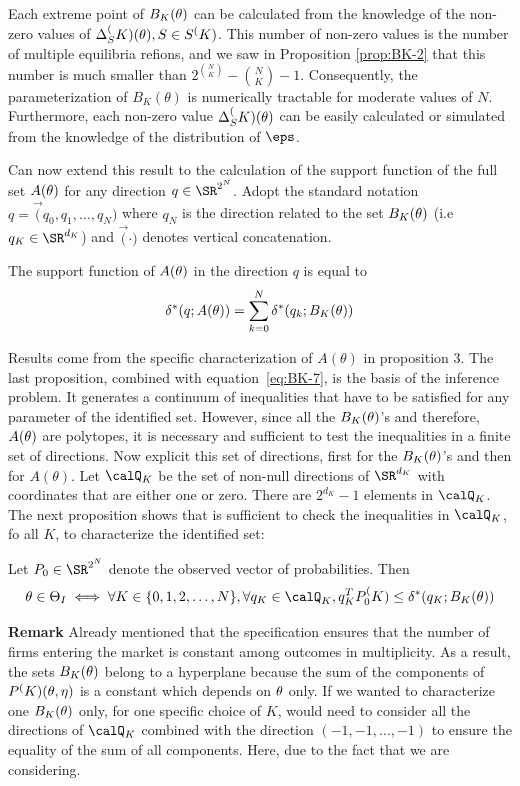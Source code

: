 Each extreme point of $B_K(\theta)$ can be calculated from the knowledge of the non-zero values of $\Delta_S^(K)(\theta), S \in S^(K)$. This number of non-zero values is the number of multiple equilibria refions, and we saw in Proposition \ref{prop:BK-2} that this number is much smaller than $2^{\binom{N}{K}} - \binom{N}{K} - 1$. Consequently, the parameterization of $B_K(\theta)$ is numerically tractable for moderate values of $N$. Furthermore, each non-zero value $\Delta_S^(K)(\theta)$ can be easily calculated or simulated from the knowledge of the distribution of $\eps$. 

Can now extend this result to the calculation of the support function of the full set $A(\theta)$ for any direction $q \in  \SR^{2^N}$. Adopt the standard notation $q = \vec(q_0, q_1, \dots, q_N)$ where $q_N$ is the direction related to the set $B_K(\theta)$ (i.e $q_K \in \SR^{d_K}$) and $\vec(\cdot)$ denotes vertical concatenation. 

\begin{prop}
	\label{prop:BK-5}
	The support function of $A(\theta)$ in the direction $q$ is equal to 
	\begin{equation}
		\label{eq:BK-9}
		\delta^*(q;A(\theta)) = \sum_{k=0}^N \delta^*(q_k;B_K(\theta))
	\end{equation}
\end{prop}

Results come from the specific characterization of $A(\theta)$ in proposition $3$. The last proposition, combined with equation~\eqref{eq:BK-7}, is the basis of the inference problem. It generates a continuum of inequalities that have to be satisfied for any parameter of the identified set. However, since all the $B_K(\theta)$'s and therefore, $A(\theta)$ are polytopes, it is necessary and sufficient to test the inequalities in a finite set of directions. Now explicit this set of directions, first for the $B_K(\theta)$'s and then for $A(\theta)$. Let $\calQ_K$ be the set of non-null directions of $\SR^{d_K}$ with coordinates that are either one or zero. There are $2^{d_K} - 1$ elements in $\calQ_K$. The next proposition shows that is sufficient to check the inequalities in $\calQ_K$, fo all $K$, to characterize the identified set:
\begin{prop}
	\label{prop:BK-6}
	Let $P_0\in\SR^{2^N}$ denote the observed vector of probabilities. Then
	\[\theta\in\T_I \iff \forall K \in \{0,1,2,\dots, N\}, \forall q_K \in \calQ_K, q_K^T P_0^\PK \leq \delta^*(q_K;B_K(\t))\]
\end{prop}
\textbf{Remark} Already mentioned that the specification ensures that the number of firms entering the market is constant among outcomes in multiplicity. As a result, the sets $B_K(\theta)$ belong to a hyperplane because the sum of the components of $P^(K)(\theta,\eta)$ is a constant which depends on $\theta$ only. If we wanted to characterize one $B_K(\theta)$ only, for one specific choice of $K$, would need to consider all the directions of $\calQ_K$ combined with the direction $(-1,-1,\dots, -1)$ to ensure the equality of the sum of all components. Here, due to the fact that we are considering. 

